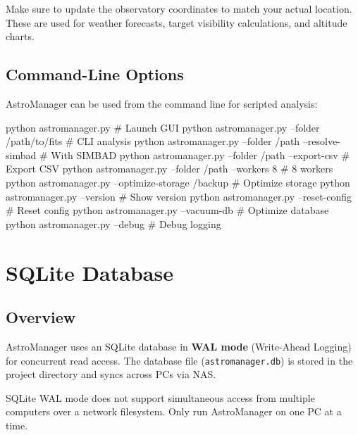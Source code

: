 \documentclass[11pt,a4paper]{article}
\begin{document}
\begin{warningbox}
Make sure to update the observatory coordinates to match your actual location. These are used for weather forecasts, target visibility calculations, and altitude charts.
\end{warningbox}

\subsection{Command-Line Options}

AstroManager can be used from the command line for scripted analysis:

\begin{codeblock}
python astromanager.py                                  # Launch GUI
python astromanager.py --folder /path/to/fits           # CLI analysis
python astromanager.py --folder /path --resolve-simbad  # With SIMBAD
python astromanager.py --folder /path --export-csv      # Export CSV
python astromanager.py --folder /path --workers 8       # 8 workers
python astromanager.py --optimize-storage /backup       # Optimize storage
python astromanager.py --version                        # Show version
python astromanager.py --reset-config                   # Reset config
python astromanager.py --vacuum-db                      # Optimize database
python astromanager.py --debug                          # Debug logging
\end{codeblock}


\section{SQLite Database}
\label{sec:schema}

\subsection{Overview}

AstroManager uses an SQLite database in \textbf{WAL mode} (Write-Ahead Logging) for concurrent read access. The database file (\texttt{astromanager.db}) is stored in the project directory and syncs across PCs via NAS.

\begin{warningbox}
SQLite WAL mode does not support simultaneous access from multiple computers over a network filesystem. Only run AstroManager on one PC at a time.
\end{warningbox}
\end{document}
